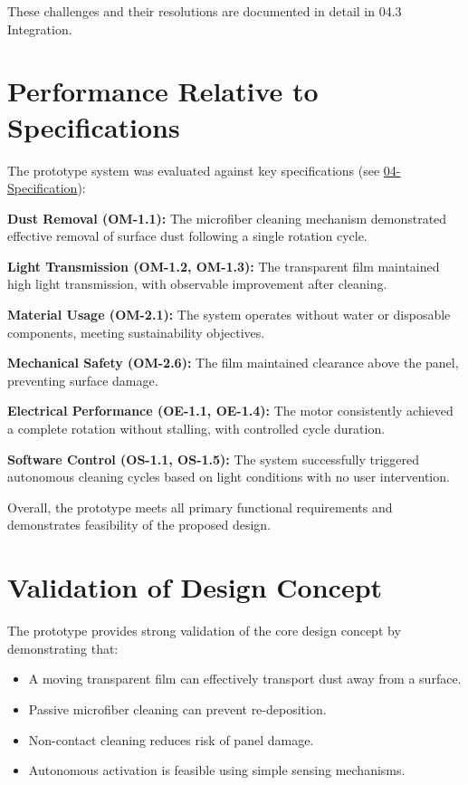 \documentclass[12pt]{article}
\begin{document}
These challenges and their resolutions are documented in detail in 04.3 Integration.

\section{Performance Relative to Specifications}

The prototype system was evaluated against key specifications (see \href{https://docs.google.com/spreadsheets/d/19Sxo5atl2CzB1H0pCT4QkIaBSSTG0vjS/edit?gid=1424656124#gid=1424656124}{04-Specification}):

\textbf{Dust Removal (OM-1.1):} The microfiber cleaning mechanism demonstrated effective removal of surface dust following a single rotation cycle.

\textbf{Light Transmission (OM-1.2, OM-1.3):} The transparent film maintained high light transmission, with observable improvement after cleaning.

\textbf{Material Usage (OM-2.1):} The system operates without water or disposable components, meeting sustainability objectives.

\textbf{Mechanical Safety (OM-2.6):} The film maintained clearance above the panel, preventing surface damage.

\textbf{Electrical Performance (OE-1.1, OE-1.4):} The motor consistently achieved a complete rotation without stalling, with controlled cycle duration.

\textbf{Software Control (OS-1.1, OS-1.5):} The system successfully triggered autonomous cleaning cycles based on light conditions with no user intervention.

Overall, the prototype meets all primary functional requirements and demonstrates feasibility of the proposed design.

\section{Validation of Design Concept}

The prototype provides strong validation of the core design concept by demonstrating that:

\begin{itemize}
    \item A moving transparent film can effectively transport dust away from a surface.
    \item Passive microfiber cleaning can prevent re-deposition.
    \item Non-contact cleaning reduces risk of panel damage.
    \item Autonomous activation is feasible using simple sensing mechanisms.
\end{itemize}
\end{document}
